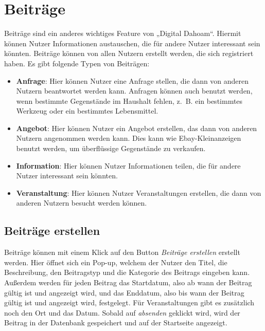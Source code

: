 \section{Beiträge}
\label{sec:contributions}

Beiträge sind ein anderes wichtiges Feature von „Digital Dahoam“.
Hiermit können Nutzer Informationen austauschen, die für andere Nutzer interessant sein könnten.
Beiträge können von allen Nutzern erstellt werden, die sich registriert haben.
Es gibt folgende Typen von Beiträgen:

\begin{itemize}
  \item \textbf{Anfrage}: Hier können Nutzer eine Anfrage stellen, die dann von anderen Nutzern beantwortet werden kann. Anfragen können auch benutzt werden, wenn bestimmte Gegenstände im Haushalt fehlen, z. B. ein bestimmtes Werkzeug oder ein bestimmtes Lebensmittel.
  \item \textbf{Angebot}: Hier können Nutzer ein Angebot erstellen, das dann von anderen Nutzern angenommen werden kann. Dies kann wie Ebay-Kleinanzeigen benutzt werden, um überflüssige Gegenstände zu verkaufen.
  \item \textbf{Information}: Hier können Nutzer Informationen teilen, die für andere Nutzer interessant sein könnten.
  \item \textbf{Veranstaltung}: Hier können Nutzer Veranstaltungen erstellen, die dann von anderen Nutzern besucht werden können.
\end{itemize}

\subsection{Beiträge erstellen}
\label{sec:createpost}

Beiträge können mit einem Klick auf den Button \textit{Beiträge erstellen} erstellt werden.
Hier öffnet sich ein Pop-up, welchem der Nutzer den Titel, die Beschreibung, den Beitragstyp und die Kategorie des Beitrags eingeben kann.
Außerdem werden für jeden Beitrag das Startdatum, also ab wann der Beitrag gültig ist und angezeigt wird, und das Enddatum, also bis wann der Beitrag gültig ist und angezeigt wird, festgelegt.
Für Veranstaltungen gibt es zusätzlich noch den Ort und das Datum.
Sobald auf \textit{absenden} geklickt wird, wird der Beitrag in der Datenbank gespeichert und auf der Startseite angezeigt.

